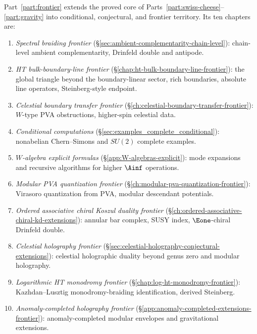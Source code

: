 Part~\ref{part:frontier} extends the proved core of
Parts~\ref{part:swiss-cheese}--\ref{part:gravity} into conditional,
conjectural, and frontier territory. Its ten chapters are:

\begin{enumerate}[label=\textup{(\arabic*)}]
\item \emph{Spectral braiding frontier}
 (\S\ref{sec:ambient-complementarity-chain-level}):
 chain-level ambient complementarity, Drinfeld double and antipode.

\item \emph{HT bulk-boundary-line frontier}
 (\S\ref{chap:ht-bulk-boundary-line-frontier}):
 the global triangle beyond the boundary-linear sector,
 rich boundaries, absolute line operators, Steinberg-style endpoint.

\item \emph{Celestial boundary transfer frontier}
 (\S\ref{ch:celestial-boundary-transfer-frontier}):
 $W$-type PVA obstructions, higher-spin celestial data.

\item \emph{Conditional computations}
 (\S\ref{sec:examples_complete_conditional}):
 nonabelian Chern--Simons and $SU(2)$ complete examples.

\item \emph{$W$-algebra explicit formulas}
 (\S\ref{app:W-algebras-explicit}):
 mode expansions and recursive algorithms for higher $\Ainf$ operations.

\item \emph{Modular PVA quantization frontier}
 (\S\ref{ch:modular-pva-quantization-frontier}):
 Virasoro quantization from PVA, modular descendant potentials.

\item \emph{Ordered associative chiral Koszul duality frontier}
 (\S\ref{ch:ordered-associative-chiral-kd-extensions}):
 annular bar complex, SUSY index, $\Eone$-chiral Drinfeld double.

\item \emph{Celestial holography frontier}
 (\S\ref{sec:celestial-holography-conjectural-extensions}):
 celestial holographic duality beyond genus zero and modular holography.

\item \emph{Logarithmic HT monodromy frontier}
 (\S\ref{chap:log-ht-monodromy-frontier}):
 Kazhdan--Lusztig monodromy-braiding identification, derived Steinberg.

\item \emph{Anomaly-completed holography frontier}
 (\S\ref{app:anomaly-completed-extensions-frontier}):
 anomaly-completed modular envelopes and gravitational extensions.
\end{enumerate}

